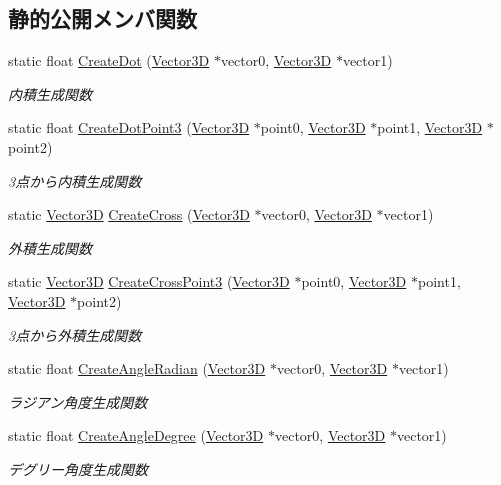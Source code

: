 \subsection*{静的公開メンバ関数}
\begin{DoxyCompactItemize}
\item 
static float \mbox{\hyperlink{class_vector3_d_ae4985d83fb38247a24ba42a82a3e7def}{Create\+Dot}} (\mbox{\hyperlink{class_vector3_d}{Vector3D}} $\ast$vector0, \mbox{\hyperlink{class_vector3_d}{Vector3D}} $\ast$vector1)
\begin{DoxyCompactList}\small\item\em 内積生成関数 \end{DoxyCompactList}\item 
static float \mbox{\hyperlink{class_vector3_d_ac83144257d920f85a5634b5087219b61}{Create\+Dot\+Point3}} (\mbox{\hyperlink{class_vector3_d}{Vector3D}} $\ast$point0, \mbox{\hyperlink{class_vector3_d}{Vector3D}} $\ast$point1, \mbox{\hyperlink{class_vector3_d}{Vector3D}} $\ast$point2)
\begin{DoxyCompactList}\small\item\em 3点から内積生成関数 \end{DoxyCompactList}\item 
static \mbox{\hyperlink{class_vector3_d}{Vector3D}} \mbox{\hyperlink{class_vector3_d_a7520b0efa372a10ab9a5a5f312bf999e}{Create\+Cross}} (\mbox{\hyperlink{class_vector3_d}{Vector3D}} $\ast$vector0, \mbox{\hyperlink{class_vector3_d}{Vector3D}} $\ast$vector1)
\begin{DoxyCompactList}\small\item\em 外積生成関数 \end{DoxyCompactList}\item 
static \mbox{\hyperlink{class_vector3_d}{Vector3D}} \mbox{\hyperlink{class_vector3_d_aa7ba79be5ad8d9d0b94de9d94e55c053}{Create\+Cross\+Point3}} (\mbox{\hyperlink{class_vector3_d}{Vector3D}} $\ast$point0, \mbox{\hyperlink{class_vector3_d}{Vector3D}} $\ast$point1, \mbox{\hyperlink{class_vector3_d}{Vector3D}} $\ast$point2)
\begin{DoxyCompactList}\small\item\em 3点から外積生成関数 \end{DoxyCompactList}\item 
static float \mbox{\hyperlink{class_vector3_d_ac2e3a4f5dbef0f56fbb6be70109163e5}{Create\+Angle\+Radian}} (\mbox{\hyperlink{class_vector3_d}{Vector3D}} $\ast$vector0, \mbox{\hyperlink{class_vector3_d}{Vector3D}} $\ast$vector1)
\begin{DoxyCompactList}\small\item\em ラジアン角度生成関数 \end{DoxyCompactList}\item 
static float \mbox{\hyperlink{class_vector3_d_acc5d9faf504a6ce741276d0d6e6d44a5}{Create\+Angle\+Degree}} (\mbox{\hyperlink{class_vector3_d}{Vector3D}} $\ast$vector0, \mbox{\hyperlink{class_vector3_d}{Vector3D}} $\ast$vector1)
\begin{DoxyCompactList}\small\item\em デグリー角度生成関数 \end{DoxyCompactList}\end{DoxyCompactItemize}


